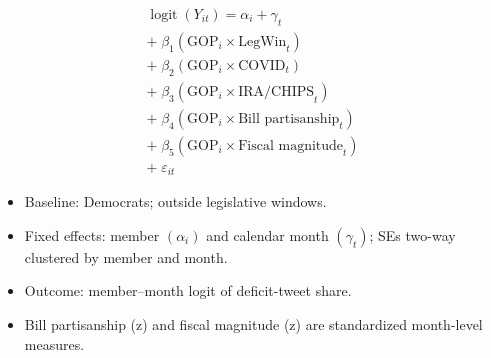 \documentclass[preview,border=14pt,11pt,fleqn,leqno]{standalone}
\begin{document}
\begin{minipage}{0.92\linewidth}
\begin{equation}
\tag{1}
\begin{aligned}
\operatorname{logit}(Y_{it}) = \alpha_i + \gamma_t \\ +\; \beta_{1}(\text{GOP}_i\!\times\!\text{LegWin}_t) \\ +\; \beta_{2}(\text{GOP}_i\!\times\!\text{COVID}_t) \\ +\; \beta_{3}(\text{GOP}_i\!\times\!\text{IRA/CHIPS}_t) \\ +\; \beta_{4}(\text{GOP}_i\!\times\!\text{Bill partisanship}_t) \\ +\; \beta_{5}(\text{GOP}_i\!\times\!\text{Fiscal magnitude}_t) \\ +\; \varepsilon_{it}
\end{aligned}
\end{equation}
\vspace{0.25em}
{\itshape
\begin{itemize}[leftmargin=*,nosep]
\item Baseline: Democrats; outside legislative windows.
\item Fixed effects: member $(\alpha_i)$ and calendar month $(\gamma_t)$; SEs two-way clustered by member and month.
\item Outcome: member–month logit of deficit-tweet share.
\item Bill partisanship (z) and fiscal magnitude (z) are standardized month-level measures.
\end{itemize}
}
\end{minipage}
\end{document}

